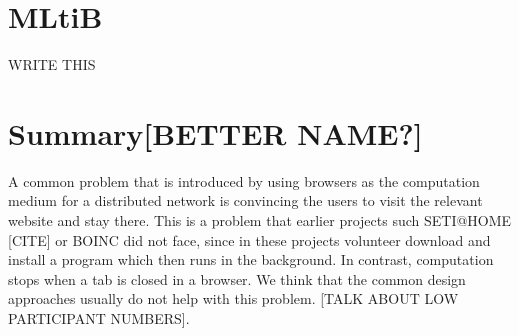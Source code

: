 \section*{MLtiB}
WRITE THIS

\section*{Summary[BETTER NAME?]}
A common problem that is introduced by using browsers as the computation medium for a distributed network is convincing the users to visit the relevant website and stay there. This is a problem that earlier projects such SETI@HOME [CITE] or BOINC did not face, since in these projects volunteer download and install a program which then runs in the background. In contrast, computation stops when a tab is closed in a browser. We think that the common design approaches usually do not help with this problem. [TALK ABOUT LOW PARTICIPANT NUMBERS]. 






